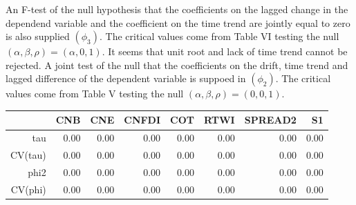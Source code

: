 \documentclass{article}\usepackage{graphicx, color}
\makeatletter
\newenvironment{kframe}{%
 \def\at@end@of@kframe{}%
 \ifinner\ifhmode%
  \def\at@end@of@kframe{\end{minipage}}%
  \begin{minipage}{\columnwidth}%
 \fi\fi%
 \def\FrameCommand##1{\hskip\@totalleftmargin \hskip-\fboxsep
 \colorbox{shadecolor}{##1}\hskip-\fboxsep
     \hskip-\linewidth \hskip-\@totalleftmargin \hskip\columnwidth}%
 \MakeFramed {\advance\hsize-\width
   \@totalleftmargin\z@ \linewidth\hsize
   \@setminipage}}%
 {\par\unskip\endMakeFramed%
 \at@end@of@kframe}
\newenvironment{knitrout}{}{} %
\makeatother
\begin{document}
An F-test of the null hypothesis that the coefficients on the lagged change in the dependend variable and the coefficient on the time trend are jointly equal to zero is also supplied $(\phi_3)$.  The critical values come from Table VI \citep{DF1981} testing the null $(\alpha, \beta, \rho) = (\alpha, 0, 1)$.  It seems that unit root and lack of time trend cannot be rejected. A joint test of the null that the coefficients on the drift, time trend and lagged difference of the dependent variable is suppoed in $(\phi_2)$.  The critical values come from Table V \citep{DF1981} testing the null $(\alpha, \beta, \rho) = (0, 0, 1)$.
\begin{knitrout}
\color{fgcolor}\begin{kframe}


{\ttfamily\noindent\bfseries\color{errorcolor}{\#\# Error: object 'd' not found}}

{\ttfamily\noindent\bfseries\color{errorcolor}{\#\# Error: object 'd' not found}}

{\ttfamily\noindent\bfseries\color{errorcolor}{\#\# Error: object 'd' not found}}

{\ttfamily\noindent\bfseries\color{errorcolor}{\#\# Error: object 'd' not found}}

{\ttfamily\noindent\bfseries\color{errorcolor}{\#\# Error: object 'd' not found}}

{\ttfamily\noindent\bfseries\color{errorcolor}{\#\# Error: object 'd' not found}}

{\ttfamily\noindent\bfseries\color{errorcolor}{\#\# Error: object 'd' not found}}\end{kframe}
\end{knitrout}


\begin{kframe}


{\ttfamily\noindent\bfseries\color{errorcolor}{\#\# Error: could not find function "ur.df"}}\end{kframe}%
\begin{table}[ht]
\begin{center}
\begin{tabular}{rrrrrrrr}
  \hline
 & CNB & CNE & CNFDI & COT & RTWI & SPREAD2 & S1 \\ 
  \hline
tau & 0.00 & 0.00 & 0.00 & 0.00 & 0.00 & 0.00 & 0.00 \\ 
  CV(tau) & 0.00 & 0.00 & 0.00 & 0.00 & 0.00 & 0.00 & 0.00 \\ 
  phi2 & 0.00 & 0.00 & 0.00 & 0.00 & 0.00 & 0.00 & 0.00 \\ 
  CV(phi) & 0.00 & 0.00 & 0.00 & 0.00 & 0.00 & 0.00 & 0.00 \\ 
   \hline
\end{tabular}
\end{center}
\end{table}
\end{document}
